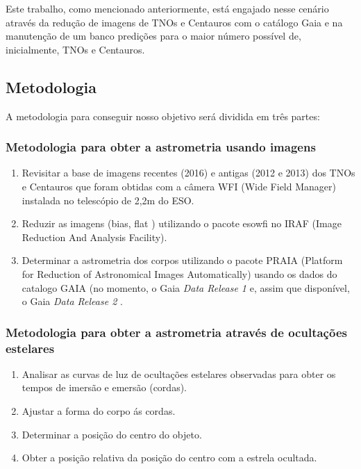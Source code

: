 \documentclass[a4paper, 11pt]{article}
\begin{document}
Este trabalho, como mencionado anteriormente, está engajado nesse cenário através da redução de imagens de TNOs e Centauros com o catálogo Gaia e na manutenção de um banco predições para o maior número possível de, inicialmente, TNOs e Centauros.

\newpage
\subsection{Metodologia}

A metodologia para conseguir nosso objetivo será dividida em três partes:

\subsubsection{Metodologia para obter a astrometria usando imagens}
\begin{enumerate}
  \item Revisitar a base de imagens recentes (2016) e antigas (2012 e 2013) dos TNOs e Centauros que foram obtidas com a câmera WFI (Wide Field Manager) instalada no telescópio de 2,2m do ESO.
  \item Reduzir as imagens (bias, flat ) utilizando o pacote esowfi no IRAF (Image Reduction And Analysis Facility). 
  \item Determinar a astrometria dos corpos utilizando o pacote PRAIA (Platform for Reduction of Astronomical Images Automatically) usando os dados do catalogo GAIA (no momento, o Gaia {\it Data Release 1} \citep{2016A&A...595A...4L} e, assim que disponível, o Gaia {\it Data Release 2} \citep{2017arXiv171010816K}.
\end{enumerate}

\subsubsection{Metodologia para obter a astrometria através de ocultações estelares}
\begin{enumerate}
  \item Analisar as curvas de luz de ocultações estelares observadas para obter os tempos de imersão e emersão (cordas).
  \item Ajustar a forma do corpo ás cordas.
  \item Determinar a posição do centro do objeto.
  \item Obter a posição relativa da posição do centro com a estrela ocultada.
\end{enumerate}
\end{document}

